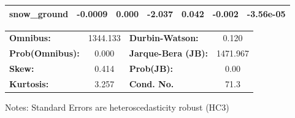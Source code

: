 \begin{center}
\begin{tabular}{lcccccc}
\textbf{snow\_ground} &      -0.0009  &        0.000     &    -2.037  &         0.042        &       -0.002    &    -3.56e-05     \\
\bottomrule
\end{tabular}
\begin{tabular}{lclc}
\textbf{Omnibus:}       & 1344.133 & \textbf{  Durbin-Watson:     } &    0.120  \\
\textbf{Prob(Omnibus):} &   0.000  & \textbf{  Jarque-Bera (JB):  } & 1471.967  \\
\textbf{Skew:}          &   0.414  & \textbf{  Prob(JB):          } &     0.00  \\
\textbf{Kurtosis:}      &   3.257  & \textbf{  Cond. No.          } &     71.3  \\
\bottomrule
\end{tabular}
\end{center}

Notes: \newline
 [1] Standard Errors are heteroscedasticity robust (HC3)